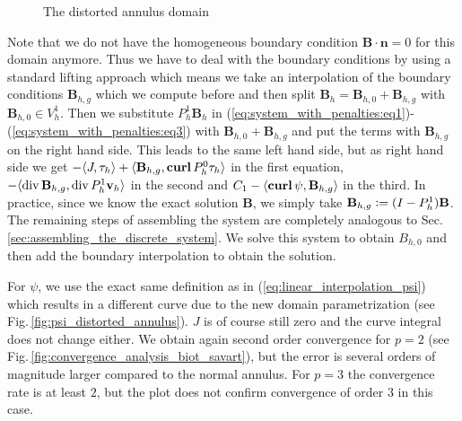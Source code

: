 \documentclass[../master_thesis.tex]{subfiles}
\begin{document}
\begin{figure}
    \centering
    \caption{The distorted annulus domain}
    \label{fig:distorted_annulus_domain}
\end{figure}


Note that we do not have 
the homogeneous boundary condition
$\mathbf{B}\cdot \mathbf{n} = 0$ for this domain anymore. Thus we have to deal with the boundary conditions 
by using a standard lifting approach which means we take an interpolation of the boundary conditions 
$\mathbf{B}_{h,g}$ which we compute before and then split
$\mathbf{B}_{h} = \mathbf{B}_{h,0} + \mathbf{B}_{h,g}$ with $\mathbf{B}_{h,0}\in V_h^1$.
Then we substitute $P_h^1 \mathbf{B}_h$ in 
(\ref{eq:system_with_penalties:eq1})-(\ref{eq:system_with_penalties:eq3}) 
with $\mathbf{B}_{h,0} + \mathbf{B}_{h,g}$ and put the terms with  
$\mathbf{B}_{h,g}$ on the right hand side. 
This leads to the same left hand side, but as right hand side we get
$-\langle J, \tau_h \rangle + \langle \mathbf{B}_{h,g}, \veccurl P_h^0 \tau_h \rangle$ in 
the first equation, $-\langle\operatorname{div}  \mathbf{B}_{h,g} ,\operatorname{div} P_h^1\mathbf{v}_{h} \rangle$
in the second and $C_1 - \langle\veccurl \psi,\mathbf{B}_{h,g} \rangle$ 
in the third. In practice, since we know the exact solution $\mathbf{B}$, we simply take 
$\mathbf{B}_{h,g} \vcentcolon= (I-P^1_h)\mathbf{B}$. The remaining steps of assembling 
the system are completely analogous to Sec.\,\ref{sec:assembling_the_discrete_system}. 
We solve this system to obtain $B_{h,0}$ and then add the boundary 
interpolation to obtain the solution.

For $\psi$, we use the exact same definition as in (\ref{eq:linear_interpolation_psi}) 
which results in a different 
curve due to the new domain parametrization (see Fig.\,\ref{fig:psi_distorted_annulus}). $J$ is of course
still zero and the curve integral does not change either. We obtain again 
second order convergence for $p=2$ (see Fig.\,\ref{fig:convergence_analysis_biot_savart}), 
but the error is several orders of magnitude larger compared to the normal annulus. 
For $p=3$ the convergence rate is at least $2$, but the plot does not confirm 
convergence of order $3$ in this case.
\end{document}
